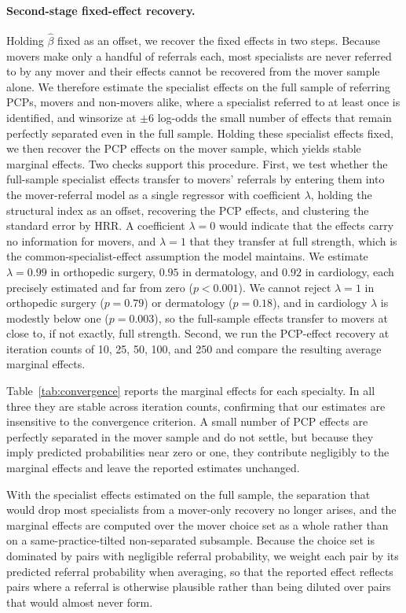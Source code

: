 \documentclass[12pt]{article}
\begin{document}
\paragraph{Second-stage fixed-effect recovery.} Holding $\hat{\beta}$ fixed as an offset, we recover the fixed effects in two steps. Because movers make only a handful of referrals each, most specialists are never referred to by any mover and their effects cannot be recovered from the mover sample alone. We therefore estimate the specialist effects on the full sample of referring PCPs, movers and non-movers alike, where a specialist referred to at least once is identified, and winsorize at $\pm 6$ log-odds the small number of effects that remain perfectly separated even in the full sample. Holding these specialist effects fixed, we then recover the PCP effects on the mover sample, which yields stable marginal effects. Two checks support this procedure. First, we test whether the full-sample specialist effects transfer to movers' referrals by entering them into the mover-referral model as a single regressor with coefficient $\lambda$, holding the structural index as an offset, recovering the PCP effects, and clustering the standard error by HRR. A coefficient $\lambda = 0$ would indicate that the effects carry no information for movers, and $\lambda = 1$ that they transfer at full strength, which is the common-specialist-effect assumption the model maintains. We estimate $\lambda = 0.99$ in orthopedic surgery, $0.95$ in dermatology, and $0.92$ in cardiology, each precisely estimated and far from zero ($p < 0.001$). We cannot reject $\lambda = 1$ in orthopedic surgery ($p = 0.79$) or dermatology ($p = 0.18$), and in cardiology $\lambda$ is modestly below one ($p = 0.003$), so the full-sample effects transfer to movers at close to, if not exactly, full strength. Second, we run the PCP-effect recovery at iteration counts of 10, 25, 50, 100, and 250 and compare the resulting average marginal effects.

Table~\ref{tab:convergence} reports the marginal effects for each specialty. In all three they are stable across iteration counts, confirming that our estimates are insensitive to the convergence criterion. A small number of PCP effects are perfectly separated in the mover sample and do not settle, but because they imply predicted probabilities near zero or one, they contribute negligibly to the marginal effects and leave the reported estimates unchanged.

With the specialist effects estimated on the full sample, the separation that would drop most specialists from a mover-only recovery no longer arises, and the marginal effects are computed over the mover choice set as a whole rather than on a same-practice-tilted non-separated subsample. Because the choice set is dominated by pairs with negligible referral probability, we weight each pair by its predicted referral probability when averaging, so that the reported effect reflects pairs where a referral is otherwise plausible rather than being diluted over pairs that would almost never form.
\end{document}
